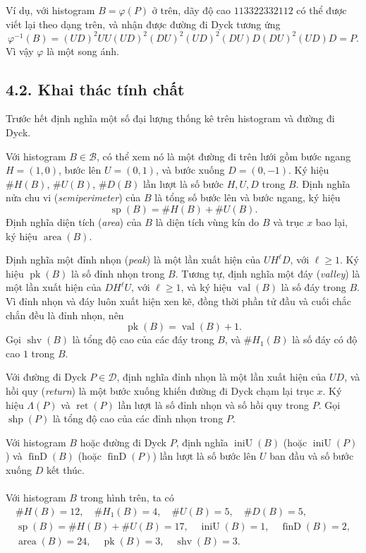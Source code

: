\documentclass[11pt]{article}
\begin{document}
Ví dụ, với histogram \(B=\varphi(P)\) ở trên, dãy độ cao
\(113322332112\) có thể được viết lại theo dạng trên, và nhận được đường đi
Dyck tương ứng
\[
  \varphi^{-1}(B)
  =(UD)^2UU(UD)^2(DU)^2(UD)^2(DU)D(DU)^2(UD)D=P.
\]
Vì vậy \(\varphi\) là một song ánh.

\subsection*{4.2. Khai thác tính chất}

Trước hết định nghĩa một số đại lượng thống kê trên histogram và đường đi
Dyck.

Với histogram \(B\in\mathcal B\), có thể xem nó là một đường đi trên lưới gồm
bước ngang \(H=(1,0)\), bước lên \(U=(0,1)\), và bước xuống \(D=(0,-1)\). Ký
hiệu \(\#H(B)\), \(\#U(B)\), \(\#D(B)\) lần lượt là số bước \(H,U,D\) trong
\(B\). Định nghĩa nửa chu vi (\emph{semiperimeter}) của \(B\) là tổng số bước
lên và bước ngang, ký hiệu
\[
  \operatorname{sp}(B)=\#H(B)+\#U(B).
\]
Định nghĩa diện tích (\emph{area}) của \(B\) là diện tích vùng kín do \(B\) và
trục \(x\) bao lại, ký hiệu \(\operatorname{area}(B)\).

Định nghĩa một đỉnh nhọn (\emph{peak}) là một lần xuất hiện của
\(UH^\ell D\), với \(\ell\ge1\). Ký hiệu \(\operatorname{pk}(B)\) là số đỉnh
nhọn trong \(B\). Tương tự, định nghĩa một đáy (\emph{valley}) là một lần xuất
hiện của \(DH^\ell U\), với \(\ell\ge1\), và ký hiệu
\(\operatorname{val}(B)\) là số đáy trong \(B\). Vì đỉnh nhọn và đáy luôn xuất
hiện xen kẽ, đồng thời phần tử đầu và cuối chắc chắn đều là đỉnh nhọn, nên
\[
  \operatorname{pk}(B)=\operatorname{val}(B)+1.
\]
Gọi \(\operatorname{shv}(B)\) là tổng độ cao của các đáy trong \(B\), và
\(\#H_1(B)\) là số đáy có độ cao \(1\) trong \(B\).

Với đường đi Dyck \(P\in\mathcal D\), định nghĩa đỉnh nhọn là một lần xuất
hiện của \(UD\), và hồi quy (\emph{return}) là một bước xuống khiến đường đi
Dyck chạm lại trục \(x\). Ký hiệu \(\Lambda(P)\) và \(\operatorname{ret}(P)\)
lần lượt là số đỉnh nhọn và số hồi quy trong \(P\). Gọi \(\operatorname{shp}(P)\)
là tổng độ cao của các đỉnh nhọn trong \(P\).

Với histogram \(B\) hoặc đường đi Dyck \(P\), định nghĩa
\(\operatorname{iniU}(B)\) (hoặc \(\operatorname{iniU}(P)\)) và
\(\operatorname{finD}(B)\) (hoặc \(\operatorname{finD}(P)\)) lần lượt là số
bước lên \(U\) ban đầu và số bước xuống \(D\) kết thúc.

\paragraph{}
Với histogram \(B\) trong hình trên, ta có
\[
\begin{gathered}
  \#H(B)=12,\quad \#H_1(B)=4,\quad \#U(B)=5,\quad \#D(B)=5,\\
  \operatorname{sp}(B)=\#H(B)+\#U(B)=17,\quad
  \operatorname{iniU}(B)=1,\quad \operatorname{finD}(B)=2,\\
  \operatorname{area}(B)=24,\quad
  \operatorname{pk}(B)=3,\quad \operatorname{shv}(B)=3.
\end{gathered}
\]
\end{document}
